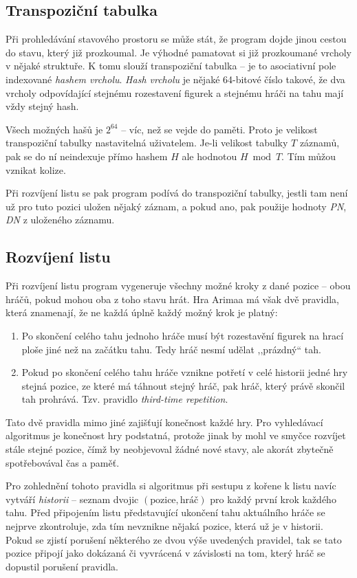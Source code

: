 \documentclass{article}
\begin{document}
\subsection{Transpoziční tabulka}
Při prohledávání stavového prostoru se může stát, že program dojde jinou cestou do stavu, který již prozkoumal. Je
výhodné pamatovat si již prozkoumané vrcholy v nějaké struktuře. K tomu slouží transpoziční tabulka -- je to asociativní
pole indexované \emph{hashem vrcholu}. \emph{Hash vrcholu} je nějaké 64-bitové číslo takové, že dva vrcholy odpovídající
stejnému rozestavení figurek a stejnému hráči na tahu mají vždy stejný hash.

Všech možných hašů je $2^{64}$ -- víc, než se vejde do paměti. Proto je velikost transpoziční tabulky nastavitelná
uživatelem. Je-li velikost tabulky $T$ záznamů, pak se do ní neindexuje přímo hashem $H$ ale hodnotou $H \bmod T$. Tím
můžou vznikat kolize.

Při rozvíjení listu se pak program podívá do transpoziční tabulky, jestli tam není už pro tuto pozici uložen nějaký
záznam, a pokud ano, pak použije hodnoty \emph{PN}, \emph{DN} z uloženého záznamu.

\subsection{Rozvíjení listu}
Při rozvíjení listu program vygeneruje všechny možné kroky z dané pozice -- obou hráčů, pokud mohou oba z toho stavu
hrát. Hra Arimaa má však dvě pravidla, která znamenají, že ne každá úplně každý možný krok je platný:
\begin{enumerate}
  \item Po skončení celého tahu jednoho hráče musí být rozestavění figurek na hrací ploše jiné než na začátku tahu. Tedy
  hráč nesmí udělat ,,prázdný`` tah.
  \item Pokud po skončení celého tahu hráče vznikne potřetí v celé historii jedné hry stejná pozice, ze které má táhnout
  stejný hráč, pak hráč, který právě skončil tah prohrává. Tzv. pravidlo \emph{third-time repetition}.
\end{enumerate}

Tato dvě pravidla mimo jiné zajišťují konečnost každé hry. Pro vyhledávací algoritmus je konečnost hry podstatná,
protože jinak by mohl ve smyčce rozvíjet stále stejné pozice, čímž by neobjevoval žádné nové stavy, ale akorát zbytečně
spotřebovával čas a paměť.

Pro zohlednění tohoto pravidla si algoritmus při sestupu z kořene k listu navíc vytváří \emph{historii} -- seznam dvojic
$(\text{pozice}, \text{hráč})$ pro každý první krok každého tahu. Před připojením listu představující ukončení tahu
aktuálního hráče se nejprve zkontroluje, zda tím nevznikne nějaká pozice, která už je v historii. Pokud se zjistí
porušení některého ze dvou výše uvedených pravidel, tak se tato pozice připojí jako dokázaná či vyvrácená v závislosti
na tom, který hráč se dopustil porušení pravidla.
\end{document}
